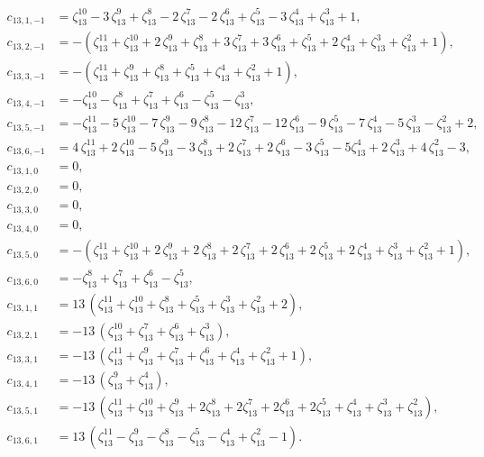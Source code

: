 \documentclass[12pt]{amsart}
\theoremstyle{definition}
\theoremstyle{remark}
\numberwithin{equation}{section}
\begin{document}
\begin{align*}
c_{13,1,-1} &= \zeta_{13}^{10}-3\, \zeta_{13}^{9}+\zeta_{13}^{8}-2\, \zeta_{13}^{7}-2\, \zeta_{13}^{6}+\zeta_{13}^{5}-3\, \zeta_{13}^{4}+\zeta_{13}^{3}+1,
\\
c_{13,2,-1} &= -(\zeta_{13}^{11}+\zeta_{13}^{10}+2\, \zeta_{13}^{9}+\zeta_{13}^{8}+3\, \zeta_{13}^{7}+3 \,\zeta_{13}^{6}+\zeta_{13}^{5}+2\, \zeta_{13}^{4}+\zeta_{13}^{3}+\zeta_{13}^{2}+1),
\\
c_{13,3,-1} &= -(\zeta_{13}^{11}+\zeta_{13}^{9}+\zeta_{13}^{8}+\zeta_{13}^{5}+\zeta_{13}^{4}+\zeta_{13}^{2}+1),
\\
c_{13,4,-1} &= -\zeta_{13}^{10}-\zeta_{13}^{8}+\zeta_{13}^{7}+\zeta_{13}^{6}-\zeta_{13}^{5}-\zeta_{13}^{3},
\\
c_{13,5,-1} &= -\zeta_{13}^{11}-5\, \zeta_{13}^{10}-7\, \zeta_{13}^{9}-9\, \zeta_{13}^{8}-12\, \zeta_{13}^{7}-12\, \zeta_{13}^{6}-9\, \zeta_{13}^{5}-7\, \zeta_{13}^{4}-5\, \zeta_{13}^{3}-\zeta_{13}^{2}+2,
\\
c_{13,6,-1} &= 4\, \zeta_{13}^{11}+2\, \zeta_{13}^{10}-5\, \zeta_{13}^{9}-3\, \zeta_{13}^{8}+2\, \zeta_{13}^{7}+2\, \zeta_{13}^{6}-3\, \zeta_{13}^{5}-5 \zeta_{13}^{4}+2\, \zeta_{13}^{3}+4\, \zeta_{13}^{2}-3,
\\
c_{13,1,0} &= 0,
\\
c_{13,2,0} &= 0,
\\
c_{13,3,0} &= 0,
\\
c_{13,4,0} &= 0,
\\
c_{13,5,0} &= -(\zeta_{13}^{11}+\zeta_{13}^{10}+2\, \zeta_{13}^{9}+2\, \zeta_{13}^{8}+2\, \zeta_{13}^{7}+2\, \zeta_{13}^{6}+2\, \zeta_{13}^{5}+2\, \zeta_{13}^{4}+\zeta_{13}^{3}+\zeta_{13}^{2}+1),
\\
c_{13,6,0} &= -\zeta_{13}^{8}+\zeta_{13}^{7}+\zeta_{13}^{6}-\zeta_{13}^{5},
\\
c_{13,1,1} &= 13\, (\zeta_{13}^{11}+\zeta_{13}^{10}+\zeta_{13}^{8}+\zeta_{13}^{5}+\zeta_{13}^{3}+\zeta_{13}^{2}+2),
\\
c_{13,2,1} &= -13\, (\zeta_{13}^{10}+\zeta_{13}^{7}+\zeta_{13}^{6}+\zeta_{13}^{3}),
\\
c_{13,3,1} &= -13\, (\zeta_{13}^{11}+\zeta_{13}^{9}+\zeta_{13}^{7}+\zeta_{13}^{6}+\zeta_{13}^{4}+\zeta_{13}^{2}+1),
\\
c_{13,4,1} &= -13\, (\zeta_{13}^{9}+\zeta_{13}^{4}),
\\
c_{13,5,1} &= -13\, (\zeta_{13}^{11}+\zeta_{13}^{10}+\zeta_{13}^{9}+2\zeta_{13}^{8}+2\zeta_{13}^{7}+2\zeta_{13}^{6}+2\zeta_{13}^{5}+\zeta_{13}^{4}+\zeta_{13}^{3}+\zeta_{13}^{2}),
\\
c_{13,6,1} &= 13\, (\zeta_{13}^{11}-\zeta_{13}^{9}-\zeta_{13}^{8}-\zeta_{13}^{5}-\zeta_{13}^{4}+\zeta_{13}^{2}-1).
\end{align*}
\end{document}
